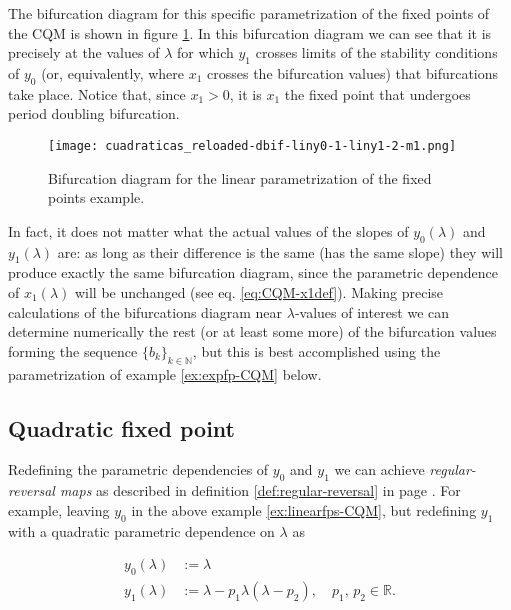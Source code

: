 \documentclass[10pt,twoside,titlepage]{book}
\numberwithin{equation}{chapter}
\numberwithin{figure}{chapter}
\numberwithin{table}{chapter}
\theoremstyle{plain}%
\theoremstyle{definition}
\theoremstyle{remark}
\begin{document}
The bifurcation diagram for this specific parametrization of the fixed points of the CQM is shown in figure \ref{fig:dbif_liny0liny1}. In this bifurcation diagram we can see that it is precisely at the values of $\lambda$ for which $y_1$ crosses limits of the stability conditions of $y_0$ (or, equivalently, where $x_1$ crosses the bifurcation values) that bifurcations take place. Notice that, since $x_1>0$, it is $x_1$ the fixed point that undergoes period doubling bifurcation.

\begin{figure}
	\centering
	\texttt{[image: cuadraticas\_reloaded-dbif-liny0-1-liny1-2-m1.png]}
	\caption{Bifurcation diagram for the linear parametrization of the fixed points example.}
	\label{fig:dbif_liny0liny1}
\end{figure}

In fact, it does not matter what the actual values of the slopes of $y_0(\lambda)$ and $y_1(\lambda)$ are: as long as their difference is the same (has the same slope) they will produce exactly the same bifurcation diagram, since the parametric dependence of $x_1(\lambda)$ will be unchanged (see eq. \ref{eq:CQM-x1def}). Making precise calculations of the bifurcations diagram near $\lambda$-values of interest we can determine numerically the rest (or at least some more) of the bifurcation values forming the sequence $\{b_k\}_{k\in\mathbb{N}}$, but this is best accomplished using the parametrization of example \ref{ex:expfp-CQM} below.

\FloatBarrier

\subsection{Quadratic fixed point}
\label{ex:quadfp-CQM}

Redefining the parametric dependencies of $y_0$ and $y_1$ we can achieve \emph{regular-reversal maps} as described in definition \ref{def:regular-reversal} in page \pageref{def:regular-reversal}. For example, leaving $y_0$ in the above example \ref{ex:linearfps-CQM}, but redefining $y_1$ with a quadratic parametric dependence on $\lambda$ as

\begin{equation}
	\begin{aligned}
		y_0(\lambda) &:=\lambda\\
		y_1(\lambda) &:=\lambda-p_1\lambda(\lambda-p_2),\quad p_1,\,p_2\in\mathbb{R}.
	\end{aligned}
	\label{eq:QuadraticDependece}
\end{equation}
\end{document}
